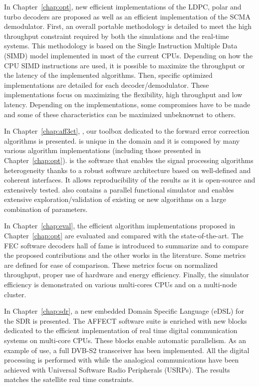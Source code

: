 In Chapter~\ref{chap:opt}, new efficient implementations of the LDPC, polar and
turbo decoders are proposed as well as an efficient implementation of the SCMA
demodulator. First, an overall portable methodology is detailed to meet the high
throughput constraint required by both the simulations and the real-time
systems. This methodology is based on the Single Instruction Multiple Data
(SIMD) model implemented in most of the current CPUs. Depending on how the CPU
SIMD instructions are used, it is possible to maximize the throughput or the
latency of the implemented algorithms. Then, specific optimized implementations
are detailed for each decoder/demodulator. These implementations focus on
maximizing the flexibility, high throughput and low latency. Depending on the
implementations, some compromises have to be made and some of these
characteristics can be maximized unbeknownst to others.

In Chapter~\ref{chap:aff3ct}, \AFFECT, our toolbox dedicated to the forward
error correction algorithms is presented. \AFFECT is unique in the domain and it
is composed by many various algorithm implementations (including those presented
in Chapter~\ref{chap:opt}). \AFFECT is the software that enables the signal
processing algorithms heterogeneity thanks to a robust software architecture
based on well-defined and coherent interfaces. It allows reproducibility of the
results as it is open-source and extensively tested. \AFFECT also contains a
parallel functional simulator and enables extensive exploration/validation of
existing or new algorithms on a large combination of parameters.

In Chapter~\ref{chap:eval}, the efficient algorithm implementations proposed
in Chapter~\ref{chap:opt} are evaluated and compared with the state-of-the-art.
The FEC software decoders hall of fame is introduced to summarize and to compare
the proposed contributions and the other works in the literature. Some metrics
are defined for ease of comparison. These metrics focus on normalized
throughput, proper use of hardware and energy efficiency. Finally, the \AFFECT
simulator efficiency is demonstrated on various multi-cores CPUs and on
a multi-node cluster.

In Chapter~\ref{chap:sdr}, a new embedded Domain Specific Language (eDSL) for
the SDR is presented. The AFFECT software suite is enriched with new blocks
dedicated to the efficient implementation of real time digital communication
systems on multi-core CPUs. These blocks enable automatic parallelism. As an
example of use, a full DVB-S2 transceiver has been implemented. All the digital
processing is performed with \AFFECT while the analogical communications have
been achieved with Universal Software Radio Peripherals (USRPs). The results
matches the satellite real time constraints.

